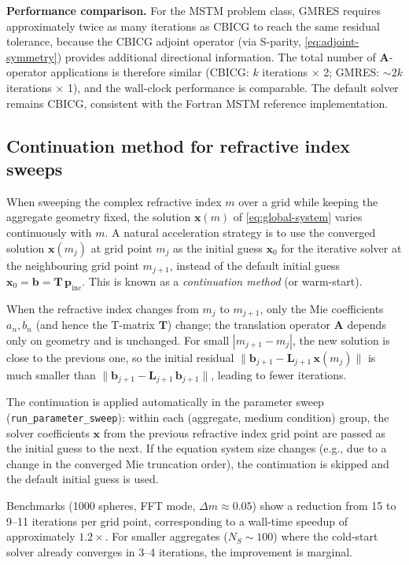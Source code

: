 \documentclass[11pt,a4paper]{article}
\begin{document}
\textbf{Performance comparison.}
For the MSTM problem class, GMRES requires approximately twice as many iterations as CBICG to reach the same residual tolerance, because the CBICG adjoint operator (via S-parity, \eqref{eq:adjoint-symmetry}) provides additional directional information.  The total number of $\mathbf{A}$-operator applications is therefore similar (CBICG: $k$ iterations $\times$ 2; GMRES: $\sim 2k$ iterations $\times$ 1), and the wall-clock performance is comparable.  The default solver remains CBICG, consistent with the Fortran MSTM reference implementation.

\subsection{Continuation method for refractive index sweeps}
\label{sec:continuation}

When sweeping the complex refractive index $m$ over a grid while keeping the aggregate geometry fixed, the solution $\bm{x}(m)$ of \eqref{eq:global-system} varies continuously with $m$.  A natural acceleration strategy is to use the converged solution $\bm{x}(m_j)$ at grid point $m_j$ as the initial guess $\bm{x}_0$ for the iterative solver at the neighbouring grid point $m_{j+1}$, instead of the default initial guess $\bm{x}_0 = \bm{b} = \mathbf{T}\,\bm{p}_\mathrm{inc}$.  This is known as a \emph{continuation method} (or warm-start).

When the refractive index changes from $m_j$ to $m_{j+1}$, only the Mie coefficients $a_n, b_n$ (and hence the T-matrix $\mathbf{T}$) change; the translation operator $\mathbf{A}$ depends only on geometry and is unchanged.  For small $|m_{j+1} - m_j|$, the new solution is close to the previous one, so the initial residual $\|\bm{b}_{j+1} - \mathbf{L}_{j+1}\,\bm{x}(m_j)\|$ is much smaller than $\|\bm{b}_{j+1} - \mathbf{L}_{j+1}\,\bm{b}_{j+1}\|$, leading to fewer iterations.

The continuation is applied automatically in the parameter sweep (\texttt{run\_parameter\_sweep}): within each (aggregate, medium condition) group, the solver coefficients $\bm{x}$ from the previous refractive index grid point are passed as the initial guess to the next.  If the equation system size changes (e.g., due to a change in the converged Mie truncation order), the continuation is skipped and the default initial guess is used.

Benchmarks (1000 spheres, FFT mode, $\Delta m \approx 0.05$) show a reduction from 15 to 9--11 iterations per grid point, corresponding to a wall-time speedup of approximately $1.2\times$.  For smaller aggregates ($N_S \sim 100$) where the cold-start solver already converges in 3--4 iterations, the improvement is marginal.
\end{document}
